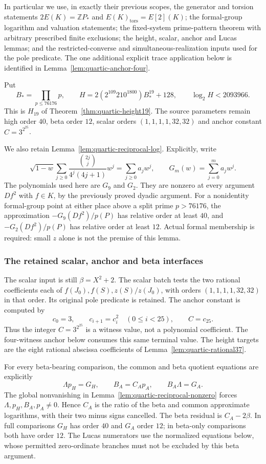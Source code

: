 \documentclass[11pt]{article}
\theoremstyle{definition}
\theoremstyle{remark}
\newcommand{\Z}{\mathbb Z}
\begin{document}
In particular we use, in exactly their previous scopes, the generator and
torsion statements $2E(K)=\Z P_*$ and $E(K)_{\mathrm{tors}}=E[2](K)$;
the formal-group logarithm and valuation statements; the fixed-system
prime-pattern theorem with arbitrary prescribed finite exclusions; the
height, scalar, anchor and Lucas lemmas; and the restricted-converse and
simultaneous-realization inputs used for the pole predicate. The one
additional explicit trace application below is identified in
Lemma~\ref{lem:quartic-anchor-four}.

Put
\[
 B_* =\prod_{p\le76176}p,\qquad
 H=2(2^{109}210^{1800})B_*^{19}+128,
 \qquad \log_2 H<2093966.
\]
This is $H_{19}$ of Theorem~\ref{thm:quartic-height19}. The
source parameters remain high order $40$, beta order $12$, scalar orders
$(1,1,1,1,32,32)$ and anchor constant $C=3^{2^{25}}$.

We also retain Lemma~\ref{lem:quartic-reciprocal-log}. Explicitly,
write
\[
 \sqrt{1-w}\sum_{j\ge0}\frac{\binom{2j}{j}}{4^j(4j+1)}w^j
       =\sum_{j\ge0}a_jw^j,\qquad
 G_m(w)=\sum_{j=0}^m a_jw^j.
\]
The polynomials used here are $G_9$ and $G_2$. They are nonzero at every
argument $Df^2$ with $f\in K$, by the previously proved dyadic argument.
For a nonidentity formal-group point at either place above a split prime
$p>76176$, the approximation $-G_9(Df^2)/p(P)$ has relative order at least
$40$, and $-G_2(Df^2)/p(P)$ has relative order at least $12$. Actual formal
membership is required: small $z$ alone is not the premise of this lemma.

\subsubsection{The retained scalar, anchor and beta interfaces}
The scalar input is still $\beta=X^2+2$. The scalar batch tests the two
rational coefficients each of $f(J_0),f(S),z(S)/z(J_0)$, with orders
$(1,1,1,1,32,32)$ in that order. Its original pole predicate is retained.
The anchor constant is computed by
\[
 c_0=3,\qquad c_{i+1}=c_i^2\quad(0\le i<25),\qquad C=c_{25}.
\]
Thus the integer $C=3^{2^{25}}$ is a witness value, not a polynomial
coefficient. The four-witness anchor below consumes this same terminal
value. The height targets are the eight rational abscissa coefficients
of Lemma~\ref{lem:quartic-rational37}.

For every beta-bearing comparison, the common and beta quotient equations
are explicitly
\[
 \Lambda p_H=G_H,\qquad B_A=C_Ap_A,\qquad B_A\Lambda=G_A.
\]
The global nonvanishing in Lemma~\ref{lem:quartic-reciprocal-nonzero}
forces $\Lambda,p_H,B_A,p_A\ne0$. Hence $C_A$ is the ratio of the beta
and common approximate logarithms, with their two minus signs cancelled.
The beta residual is $C_A-2\beta$. In full comparisons $G_H$ has order
$40$ and $G_A$ order $12$; in beta-only comparisons both have order $12$.
The Lucas numerators use the normalized equations below, whose permitted
zero-ordinate branches must not be excluded by this beta argument.
\end{document}
